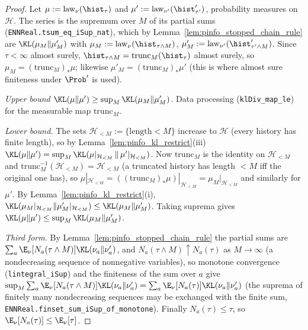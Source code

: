 \begin{proof}
\leanok
Let $\mu := \mathrm{law}_\nu(\hist_\tau)$ and $\mu' := \mathrm{law}_{\nu'}(\hist'_{\tau'})$,
probability measures on $\mathcal H$. The series is the supremum over $M$ of its partial sums
(\texttt{ENNReal.tsum\_eq\_iSup\_nat}), which by Lemma~\ref{lem:pinfo_stopped_chain_rule} are
$\KL(\mu_M\|\mu'_M)$ with $\mu_M := \mathrm{law}_\nu(\hist_{\tau\wedge M})$,
$\mu'_M := \mathrm{law}_{\nu'}(\hist'_{\tau'\wedge M})$. Since $\tau < \infty$ almost surely,
$\hist_{\tau\wedge M} = \mathrm{trunc}_M(\hist_\tau)$ almost surely, so
$\mu_M = (\mathrm{trunc}_M)_*\mu$; likewise $\mu'_M = (\mathrm{trunc}_M)_*\mu'$ (this is where
almost sure finiteness under $\Prob'$ is used).

\emph{Upper bound $\KL(\mu\|\mu') \ge \sup_M\KL(\mu_M\|\mu'_M)$.} Data processing
(\texttt{klDiv\_map\_le}) for the measurable map $\mathrm{trunc}_M$.

\emph{Lower bound.} The sets $\mathcal H_{<M} := \{\text{length} < M\}$ increase to $\mathcal H$
(every history has finite length), so by Lemma~\ref{lem:pinfo_kl_restrict}(iii)
$\KL(\mu\|\mu') = \sup_M \KL(\mu|_{\mathcal H_{<M}}\,\|\,\mu'|_{\mathcal H_{<M}})$. Now
$\mathrm{trunc}_M$ is the identity on $\mathcal H_{<M}$ and
$\mathrm{trunc}_M^{-1}(\mathcal H_{<M}) = \mathcal H_{<M}$ (a truncated history has length
$< M$ iff the original one has), so $\mu|_{\mathcal H_{<M}} = ((\mathrm{trunc}_M)_*\mu)|_{\mathcal H_{<M}}
= \mu_M|_{\mathcal H_{<M}}$ and similarly for $\mu'$. By Lemma~\ref{lem:pinfo_kl_restrict}(i),
$\KL(\mu_M|_{\mathcal H_{<M}}\|\mu'_M|_{\mathcal H_{<M}}) \le \KL(\mu_M\|\mu'_M)$. Taking suprema
gives $\KL(\mu\|\mu') \le \sup_M\KL(\mu_M\|\mu'_M)$.

\emph{Third form.} By Lemma~\ref{lem:pinfo_stopped_chain_rule} the partial sums are
$\sum_a\E_\nu[N_a(\tau\wedge M)]\KL(\nu_a\|\nu'_a)$, and $N_a(\tau\wedge M) \uparrow N_a(\tau)$
as $M \to \infty$ (a nondecreasing sequence of nonnegative variables), so monotone convergence
(\texttt{lintegral\_iSup}) and the finiteness of the sum over $a$ give
$\sup_M \sum_a\E_\nu[N_a(\tau\wedge M)]\KL(\nu_a\|\nu'_a) = \sum_a\E_\nu[N_a(\tau)]\KL(\nu_a\|\nu'_a)$
(the suprema of finitely many nondecreasing sequences may be exchanged with the finite sum,
\texttt{ENNReal.finset\_sum\_iSup\_of\_monotone}). Finally $N_a(\tau) \le \tau$, so
$\E_\nu[N_a(\tau)] \le \E_\nu[\tau]$.
\end{proof}

